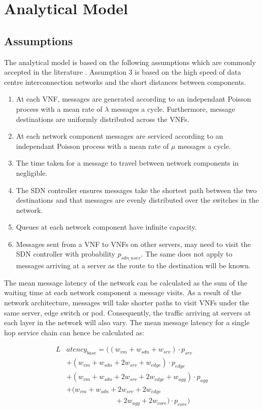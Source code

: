 
\section{Analytical Model}
\label{sec:analytical_model}

\subsection{Assumptions}
The analytical model is based on the following assumptions which are commonly accepted in the literature \cite{}. Assumption 3 is based on the high speed of data centre interconnection networks and the short distances between components.

\begin{enumerate}
\item At each VNF, messages are generated according to an independant Poisson process with a mean rate of $\lambda$ messages a cycle. Furthermore, message destinations are uniformly distributed across the VNFs.
\item At each network component messages are serviced according to an independant Poisson process with a mean rate of $\mu$ messages a cycle.
\item The time taken for a message to travel between network components in negligible.
\item The SDN controller ensures messages take the shortest path between the two destinations and that messages are evenly distributed over the switches in the network.
\item Queues at each network component have infinite capacity.
\item Messages sent from a VNF to VNFs on other servers, may need to visit the SDN controller with probability $p_{sdn\_user}$. The same does not apply to messages arriving at a server as the route to the destination will be known.
\end{enumerate}

The mean message latency of the network can be calculated as the sum of the waiting time at each network component a message visits. As a result of the network architecture, messages will take shorter paths to visit VNFs under the same server, edge switch or pod. Consequently, the traffic arriving at servers at each layer in the network will also vary. The mean message latency for a single hop service chain can hence be calculated as:

\begin{equation} 
\label{eq:mean_latency}
\begin{split}
L&atency_{base} = ((w_{vm} + w_{sdn} + w_{srv}) \cdot p_{srv} \\
		&+ (w_{vm} + w_{sdn} + 2w_{srv} + w_{edge}) \cdot p_{edge} \\
	 	&+ (w_{vm} + w_{sdn} + 2w_{srv} + 2w_{edge} + w_{agg}) \cdot p_{agg} \\
	 	&+ (w_{vm} + w_{sdn} + 2w_{srv} + 2w_{edge}  \\
		& \;\;\;\quad\qquad\quad\qquad + 2w_{agg} + 2w_{core})\cdot p_{core})
\end{split}
\end{equation}

